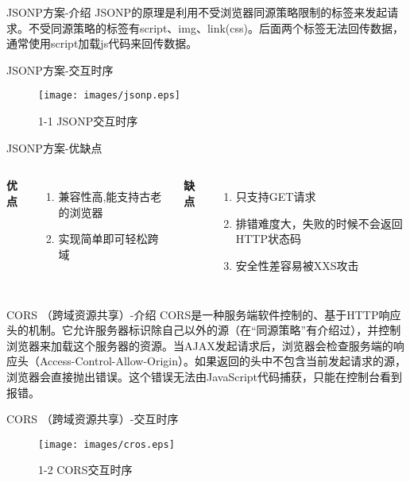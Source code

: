 \documentclass[aspectratio=169,xcolor=dvipsnames,UTF8]{beamer}
\begin{document}
	
	\begin{frame}{JSONP方案-介绍}
		JSONP的原理是利用不受浏览器同源策略限制的标签来发起请求。不受同源策略的标签有script、img、link(css)。后面两个标签无法回传数据，通常使用script加载js代码来回传数据。
	\end{frame}
	
	\begin{frame}{JSONP方案-交互时序}
		\begin{figure}
			\texttt{[image: images/jsonp.eps]}
			\caption{1-1 JSONP交互时序}
		\end{figure}
	\end{frame}
	
	\begin{frame}{JSONP方案-优缺点}
		\begin{columns}[c]
			\textbf{优点}
			\begin{enumerate}
				\item 兼容性高,能支持古老的浏览器
				\item 实现简单即可轻松跨域
			\end{enumerate}
			\textbf{缺点}
			\begin{enumerate}
				\item 只支持GET请求
				\item 排错难度大，失败的时候不会返回HTTP状态码
				\item 安全性差容易被XXS攻击
			\end{enumerate}
		\end{columns}
	\end{frame}
	
	
	\begin{frame}{CORS （跨域资源共享）-介绍}
		CORS是一种服务端软件控制的、基于HTTP响应头的机制。它允许服务器标识除自己以外的源（在“同源策略”有介绍过），并控制浏览器来加载这个服务器的资源。当AJAX发起请求后，浏览器会检查服务端的响应头（Access-Control-Allow-Origin）。如果返回的头中不包含当前发起请求的源，浏览器会直接抛出错误。这个错误无法由JavaScript代码捕获，只能在控制台看到报错。
	\end{frame}
	
	\begin{frame}{CORS （跨域资源共享）-交互时序}
		\begin{figure}
			\texttt{[image: images/cros.eps]}
			\caption{1-2 CORS交互时序}
		\end{figure}
	\end{frame}
	
\end{document}
